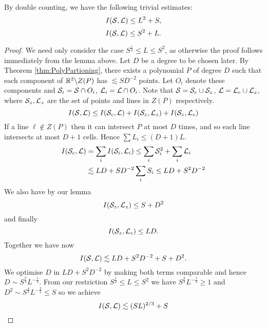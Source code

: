 \begin{lemma} 
    By double counting, we have the following trivial estimates:
    $$
    I(\mathcal S, \mathcal L) \leq L^2 + S,
    $$
    $$
    I(\mathcal S, \mathcal L) \leq S^2 + L.
    $$
    
    
\end{lemma}
\begin{proof}
We need only consider the case $S^{\frac{1}{2}} \leq L \leq S^2$, as otherwise the proof follows immediately from the lemma above. Let $D$ be a degree to be chosen later. By Theorem \ref{thm:PolyPartioning}, there
exists a polynomial $P$ of degree $D$ such that each component of $\mathbb R^2 \backslash Z(P)$ has $\lesssim SD^{-2}$ points. Let $O_i$ denote these components and $\mathcal S_i = \mathcal S \cap O_i$, $\mathcal L_i = \mathcal L \cap O_i$. 
Note that $\mathcal S = \mathcal S_c \cup \mathcal S_z$, $\mathcal L = \mathcal L_c \cup \mathcal L_z$, where $\mathcal S_z, \mathcal L_z$ are the set of points and lines in $Z(P)$ respectively.
$$I(\mathcal S, \mathcal L) \leq I(\mathcal S_c, \mathcal L) + I(\mathcal S_z, \mathcal L_z) + I(\mathcal S_z, \mathcal L_c)$$
If a line $\ell \notin Z(P)$ then it can intersect $P$ at most $D$ times, and so each line intersects at most $D+1$ cells. Hence $\sum L_i \leq (D+1)L$.
\begin{align*}
    I(\mathcal S_c, \mathcal L) &= \sum_i I(\mathcal S_i, \mathcal L_i) \leq \sum_i \mathcal S_i^2 + \sum_i \mathcal L_i\\
    &\lesssim LD + SD^{-2} \sum_i S_i \leq LD + S^2D^{-2}
\end{align*} 
We also have by our lemma
$$I(\mathcal S_z, \mathcal L_z) \leq S + D^2$$
and finally $$I(\mathcal S_z, \mathcal L_c) \leq LD.$$
Together we have now 
$$I(\mathcal S, \mathcal L) \lesssim LD + S^2D^{-2} +S + D^2.$$
We optimise $D$ in $LD + S^2D^{-2}$ by making both terms comparable and hence $D \sim S^{\frac{2}{3}} L^{-\frac{1}{3}}$. From our restriction $S^{\frac{1}{2}} \leq L \leq S^2$ we have $S^{\frac{2}{3}} L^{-\frac{1}{3}} \geq 1$
and $D^2 \sim S^{\frac{4}{3}} L^{-\frac{2}{3}} \leq S$ so we achieve
$$I(\mathcal S, \mathcal L) \lesssim (SL)^{2/3} + S $$
\end{proof}